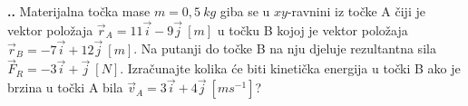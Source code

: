 
\noindent 
\textbf{
\thecjelina.\thezadatak.}
Materijalna to\v{c}ka mase $m = 0,5\ kg$ giba se u $xy$-ravnini iz točke A čiji je vektor položaja
$\vec{r}_A = 11\vec{i} - 9\vec{j}\ [m]$ u točku B kojoj je vektor položaja $\vec{r}_B= -7\vec{i} + 12\vec{j}\ [m]$. Na putanji do to\v{c}ke B na nju djeluje rezultantna sila $\vec{F}_R = -3\vec{i} + \vec{j}\ [N]$. Izračunajte 
kolika \'{c}e biti kineti\v{c}ka energija u to\v{c}ki B ako je brzina u to\v{c}ki A bila $\vec{v}_A = 3\vec{i} + 4\vec{j}\ [ms^{ -1} ]$?

